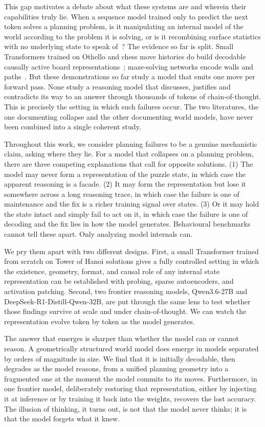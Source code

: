\documentclass{article} %
\begin{document}
This gap motivates a debate about what these systems are and wherein their capabilities truly lie. When a sequence model trained only to predict the next token solves a planning problem, is it manipulating an internal model of the world according to the problem it is solving, or is it recombining surface statistics with no underlying state to speak of~\citep{bender2021dangers}? The evidence so far is split. Small Transformers trained on Othello and chess move histories do build decodable causally active board representations~\citep{li2022emergent, toshniwal2022chess}; maze-solving networks encode walls and paths~\citep{spies2025transformers}. But these demonstrations so far study a model that emits one move per forward pass. None study a reasoning model that discusses, justifies and contradicts its way to an answer through thousands of tokens of chain-of-thought. This is precisely the setting in which such failures occur. The two literatures, the one documenting collapse and the other documenting world models, have never been combined into a single coherent study.

Throughout this work, we consider planning failures to be a genuine mechanistic claim, asking where they lie. For a model that collapses on a planning problem, there are three competing explanations that call for opposite solutions. (1) The model may never form a representation of the puzzle state, in which case the apparent reasoning is a facade. (2) It may form the representation but lose it somewhere across a long reasoning trace, in which case the failure is one of maintenance and the fix is a richer training signal over states. (3) Or it may hold the state intact and simply fail to act on it, in which case the failure is one of decoding and the fix lies in how the model generates. Behavioural benchmarks cannot tell these apart. Only analyzing model internals can.

We pry them apart with two different designs. First, a small Transformer trained from scratch on Tower of Hanoi solutions gives a fully controlled setting in which the existence, geometry, format, and causal role of any internal state representation can be established with probing, sparse autoencoders, and activation patching. Second, two frontier reasoning models, Qwen3.6-27B and DeepSeek-R1-Distill-Qwen-32B, are put through the same lens to test whether those findings survive at scale and under chain-of-thought. We can watch the representation evolve token by token as the model generates.


The answer that emerges is sharper than whether the model can or cannot reason. A geometrically structured world model does emerge  in models separated by orders of magnitude in size. We find that it is initially decodable, then degrades as the model reasons, from a unified planning geometry into a fragmented one at the moment the model commits to its moves. Furthermore, in one frontier model, deliberately restoring that representation, either by injecting it at inference or by training it back into the weights, recovers the lost accuracy. The illusion of thinking, it turns out, is not that the model never thinks; it is that the model forgets what it knew.
\end{document}
